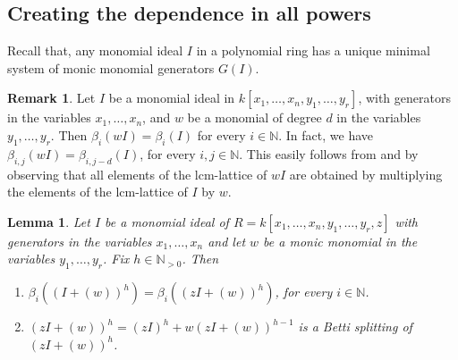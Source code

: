 \documentclass[11pt,oneside]{amsart}
\theoremstyle{plain}
\newtheorem{lemma}[theorem]{Lemma}
\theoremstyle{definition}
\newtheorem{remark}[theorem]{Remark}
\newcommand{\N}{\mathbb{N}}
\begin{document}
\subsection{Creating the dependence in all powers}
Recall that, any monomial ideal $I$ in a polynomial ring has a unique minimal system of monic monomial generators $G(I)$.

\begin{remark}\label{R.monomialTimesIdeal}
Let $I$ be a monomial ideal in $k[x_1,\dots,x_n,y_1,\dots,y_r]$, with generators in the variables $x_1,\dots,x_n$, and $w$ be a monomial of degree $d$ in the variables $y_1,\dots,y_r$. Then $\beta_{i} (wI) = \beta_{i} (I)$ for every $i \in \N$. In fact, we have 
$\beta_{i,j} (wI) = \beta_{i,j-d} (I)$, for every $i,j \in \N$. This easily follows from \cite[Theorem 2.1]{GPW99} and by observing that all elements of the lcm-lattice of $wI$ are obtained by multiplying the elements of the lcm-lattice of $I$ by $w$.
\end{remark}


\begin{lemma}\label{L.Splitting}
Let $I$ be a monomial ideal of $R=k[x_1,\dots,x_n,y_1,\dots,y_r,z]$ with generators in the variables $x_1,\dots,x_n$ and let $w$ be a monic monomial in the variables $y_1,\dots,y_r$. Fix $h \in \mathbb{N}_{>0}$. Then
\begin{enumerate}
    \item[$\mathrm{(1)}$]  $\beta_{i}((I+(w))^h)=\beta_{i}((zI+(w))^h)$, for every $i \in \mathbb{N}$.
    \item[$\mathrm{(2)}$] $(zI +(w))^h=(zI)^h+w(zI +(w))^{h-1}$ is a Betti splitting of $(zI +(w))^h$.
\end{enumerate}
\end{lemma}
\end{document}
